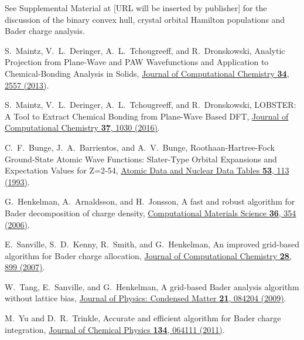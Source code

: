 \documentclass[reprint, superscriptaddress, amsmath,amssymb,prb,twocolumn]{revtex4-2}
\begin{document}
\begin{thebibliography}{116}
 See Supplemental Material at [URL will be inserted by publisher] for the discussion of the binary convex hull, crystal orbital Hamilton populations and Bader charge analysis.


 S.~Maintz, V.~L.~Deringer, A.~L.~Tchougreeff, and R.~Dronskowski, Analytic Projection from Plane-Wave and PAW Wavefunctions and Application to Chemical-Bonding Analysis in Solids, \href{https://dx.doi.org/10.1002/jcc.23424}{Journal of Computational Chemistry {\bf 34}, 2557 (2013)}.

 S.~Maintz, V.~L.~Deringer, A.~L.~Tchougreeff, and R.~Dronskowski, LOBSTER: A Tool to Extract Chemical Bonding from Plane-Wave Based DFT, \href{https://dx.doi.org/10.1002/jcc.24300}{Journal of Computational Chemistry {\bf 37}, 1030 (2016)}.

 C.~F.~Bunge, J.~A.~Barrientos, and A.~V.~Bunge, Roothaan-Hartree-Fock Ground-State Atomic Wave Functions: Slater-Type Orbital Expansions and Expectation Values for Z=2-54, \href{https://dx.doi.org/10.1006/adnd.1993.1003}{Atomic Data and Nuclear Data Tables {\bf 53}, 113 (1993)}.

 G.~Henkelman, A.~Arnaldsson, and H.~Jonsson, A fast and robust algorithm for Bader decomposition of charge density, \href{https://doi.org/10.1016/j.commatsci.2005.04.010}{Computational Materials Science {\bf 36}, 354 (2006)}. %

 E.~Sanville, S.~D.~Kenny, R.~Smith, and G.~Henkelman, An improved grid-based algorithm for Bader charge allocation, \href{https://doi.org/10.1002/jcc.20575}{Journal of Computational Chemistry {\bf 28}, 899 (2007)}.

 W.~Tang, E.~Sanville, and G.~Henkelman, A grid-based Bader analysis algorithm without lattice bias, \href{https://dx.doi.org/10.1088/0953-8984/21/8/084204}{Journal of Physics: Condensed Matter {\bf 21}, 084204 (2009)}.

 M.~Yu and D.~R.~Trinkle, Accurate and efficient algorithm for Bader charge integration, \href{https://doi.org/10.1063/1.3553716}{Journal of Chemical Physics {\bf 134}, 064111 (2011)}.


\end{thebibliography}
\end{document}
